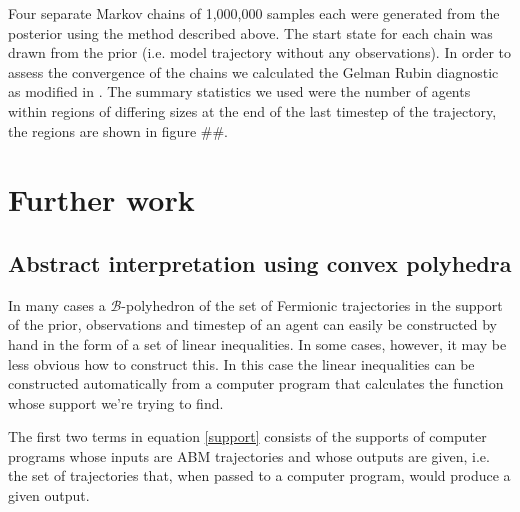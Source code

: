 \documentclass{article}
\begin{document}
Four separate Markov chains of 1,000,000 samples each were generated from the posterior using the method described above. The start state for each chain was drawn from the prior (i.e. model trajectory without any observations). In order to assess the convergence of the chains we calculated the Gelman Rubin diagnostic \cite{gelman1992inference} as modified in \cite{gelman2013bayesian}. The summary statistics we used were the number of agents within regions of differing sizes at the end of the last timestep of the trajectory, the regions are shown in figure ##.

\section{Further work}
\subsection{Abstract interpretation using convex polyhedra}

In many cases a $\mathcal{B}$-polyhedron of the set of Fermionic trajectories in the support of the prior, observations and timestep of an agent can easily be constructed by hand in the form of a set of linear inequalities. In some cases, however, it may be less obvious how to construct this. In this case the linear inequalities can be constructed automatically from a computer program that calculates the function whose support we're trying to find.





The first two terms in equation \eqref{support} consists of the supports of computer programs whose inputs are ABM trajectories and whose outputs are given, i.e. the set of trajectories that, when passed to a computer program, would produce a given output.
\end{document}
